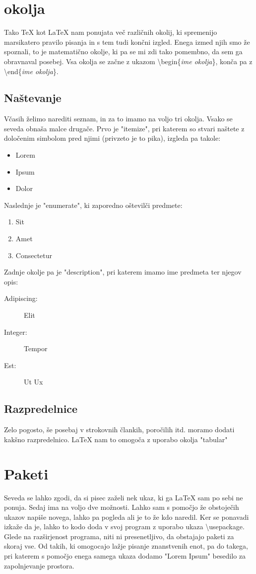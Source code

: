 \documentclass[10p, a4paper, twopage]{book}
\begin{document}
\section{okolja}

Tako \TeX{} kot \LaTeX{} nam ponujata več različnih okolij, ki spremenijo marsikatero pravilo pisanja in s tem tudi končni izgled. Enega izmed njih smo že spoznali, to je matematično okolje, ki pa se mi zdi tako pomembno, da sem ga obravnaval posebej. Vsa okolja se začne z ukazom \textbackslash{}begin\{{\em ime okolja}\}, konča pa z \textbackslash{}end\{{\em ime okolja}\}.

\subsection{Naštevanje}
Včasih želimo narediti seznam, in za to imamo na voljo tri okolja. Vsako se seveda obnaša malce drugače. Prvo je "itemize", pri katerem so stvari naštete z določenim simbolom pred njimi (privzeto je to pika), izgleda pa takole:
\begin{itemize}
\item Lorem
\item Ipsum
\item Dolor
\end{itemize}

Naslednje je "enumerate", ki zaporedno oštevilči predmete:
\begin{enumerate}
\item Sit
\item Amet
\item Consectetur
\end{enumerate}

Zadnje okolje pa je "description", pri katerem imamo ime predmeta ter njegov opis:
\begin{description}
\item[Adipiscing:] Elit
\item[Integer:] Tempor
\item[Est:] Ut Ux
\end{description}

\subsection{Razpredelnice}

Zelo pogosto, še posebaj v strokovnih člankih, poročilih itd. moramo dodati kakšno razpredelnico. \LaTeX{} nam to omogoča z uporabo okolja "tabular"

\section{Paketi}
Seveda se lahko zgodi, da si pisec zaželi nek ukaz, ki ga \LaTeX{} sam po sebi ne ponuja. Sedaj ima na voljo dve možnosti. Lahko sam s pomočjo že obstoječih ukazov napiše novega, lahko pa pogleda ali je to že kdo naredil. Ker se ponavadi izkaže da je, lahko to kodo doda v svoj program z uporabo ukaza \textbackslash{}usepackage. Glede na razširjenost programa, niti ni presenetljivo, da obstajajo paketi za skoraj vse. Od takih, ki omogocajo lažje pisanje znanstvenih enot, pa do takega, pri katerem s pomočjo enega samega ukaza dodamo "Lorem Ipsum" besedilo za zapolnjevanje prostora.
\end{document}
